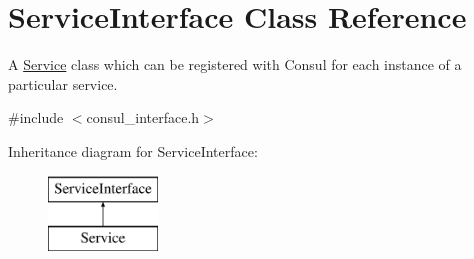 \hypertarget{classServiceInterface}{\section{Service\-Interface Class Reference}
\label{classServiceInterface}
}


A \hyperlink{classService}{Service} class which can be registered with Consul for each instance of a particular service.  




{\ttfamily \#include $<$consul\-\_\-interface.\-h$>$}

Inheritance diagram for Service\-Interface\-:\begin{figure}[H]
\begin{center}
\leavevmode
\includegraphics[height=2.000000cm]{classServiceInterface}
\end{center}
\end{figure}
